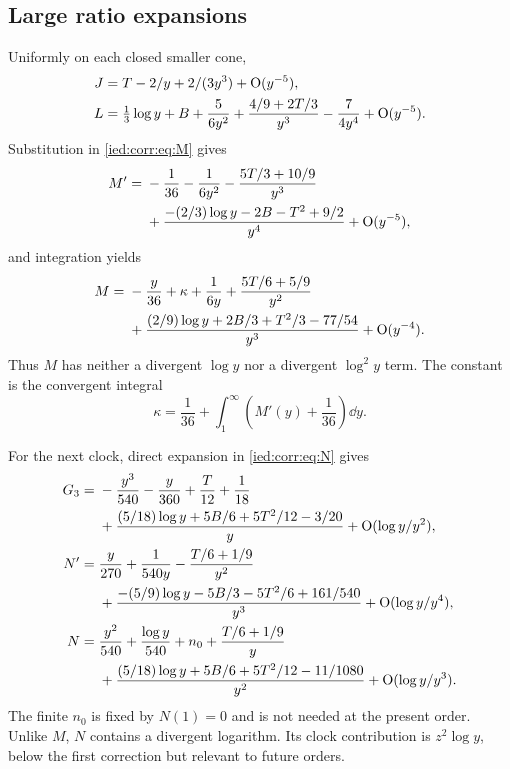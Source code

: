 \documentclass[11pt,letterpaper]{article}
\theoremstyle{remark}\newtheorem{remark}[theorem]{Remark}
\newcommand{\Oh}{\mathrm O}\newcommand{\supp}{\operatorname{supp}}
\begin{document}
\subsection{Large ratio expansions}
Uniformly on each closed smaller cone,
\begin{align}\label{ied:corr:eq:JLexp}
 J&=T-2/y+2/(3y^3)+\Oh(y^{-5}),\notag\\
 L&=\tfrac13\log y+B+\frac5{6y^2}
      +\frac{4/9+2T/3}{y^3}-\frac7{4y^4}+\Oh(y^{-5}).
\end{align}
Substitution in \eqref{ied:corr:eq:M} gives
\begin{align}\label{ied:corr:eq:Mprimeexp}
 M'={}&-\frac1{36}-\frac1{6y^2}-\frac{5T/3+10/9}{y^3}\\
 &+\frac{-(2/3)\log y-2B-T^2+9/2}{y^4}+\Oh(y^{-5}),\notag
\end{align}
and integration yields
\begin{align}\label{ied:corr:eq:Mexp}
 M={}&-\frac y{36}+\kappa+\frac1{6y}+
       \frac{5T/6+5/9}{y^2}\\
 &+\frac{(2/9)\log y+2B/3+T^2/3-77/54}{y^3}+\Oh(y^{-4}).\notag
\end{align}
Thus $M$ has neither a divergent $\log y$ nor a divergent $\log^2y$ term. The constant is the convergent integral
\begin{equation}\label{ied:corr:eq:kappaint}
 \kappa=\frac1{36}+\int_1^\infty\left(M'(y)+\frac1{36}\right)\dd y.
\end{equation}

For the next clock, direct expansion in \eqref{ied:corr:eq:N} gives
\begin{align}\label{ied:corr:eq:G3exp}
 G_3={}&-\frac{y^3}{540}-\frac y{360}+\frac T{12}+\frac1{18}\\
 &+\frac{(5/18)\log y+5B/6+5T^2/12-3/20}{y}
       +\Oh(\log y/y^2),\notag\\
 N'={}&\frac y{270}+\frac1{540y}-\frac{T/6+1/9}{y^2}\notag\\
 &+\frac{-(5/9)\log y-5B/3-5T^2/6+161/540}{y^3}
       +\Oh(\log y/y^4),\notag\\
 N={}&\frac{y^2}{540}+\frac{\log y}{540}+n_0+\frac{T/6+1/9}{y}\notag\\
 &+\frac{(5/18)\log y+5B/6+5T^2/12-11/1080}{y^2}
       +\Oh(\log y/y^3).\notag
\end{align}
The finite $n_0$ is fixed by $N(1)=0$ and is not needed at the present order. Unlike $M$, $N$ contains a divergent logarithm. Its clock contribution is $z^2\log y$, below the first correction but relevant to future orders.
\end{document}
